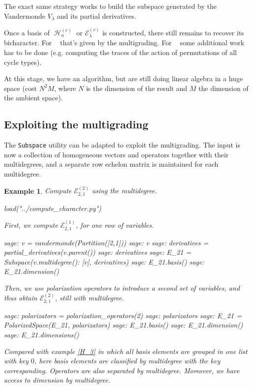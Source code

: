 \documentclass[letter,12pt]{article}
\DeclareMathOperator{\Sn}{\mathbb{S}_n}
\DeclareMathOperator{\GLr}{GL_r}
\DeclareMathOperator{\harmonics}{\mathcal{H}}
\newtheorem{example}{Example}
\begin{document}
	The exact same strategy works to build the subspace generated by the Vandermonde $V_{\lambda}$ and its partial derivatives. 
	
	Once a basis of $\harmonics_n^{(r)}$ or $\mathcal{E}_\lambda^{(r)}$ is constructed, there still remains to recover its bicharacter. For $\GLr$ that's given by the multigrading. For $\Sn$ some additional work has to be done (e.g. computing the traces of the action of permutations of all cycle types).
	
	At this stage, we have an algorithm, but are still doing linear algebra in a huge space (cost $N^2 M$, where $N$ is the dimension of the result and $M$ the dimension of the ambient space).
	
	\subsection{Exploiting the multigrading}
	
	The \texttt{Subspace} utility can be adapted to exploit the multigrading. The input is now a collection of homogeneous vectors and operators together with their multidegrees, and a separate row echelon matrix is maintained for each multidegree.
	
	\begin{example} Compute $\mathcal{E}_{2,1}^{(2)}$ using the multidegree. 
		\begin{sagesilent}
			load("../compute_character.py")
		\end{sagesilent}
		First, we compute $\mathcal{E}_{2,1}^{(1)}$, for one row of variables. 
		\begin{sagecommandline}
			sage: v = vandermonde(Partition([2,1]))
			sage: v
			sage: derivatives = partial_derivatives(v.parent())
			sage: derivatives
			sage: E_21 = Subspace({v.multidegree(): [v]}, derivatives)
			sage: E_21.basis()
			sage: E_21.dimension()
		\end{sagecommandline}
		Then, we use polarization operators to introduce a second set of variables, and thus obtain $\mathcal{E}_{2,1}^{(2)}$, still with multidegree. 
		\begin{sagecommandline}
			sage: polarizators = polarization_operators(2)
			sage: polarizators
			sage: E_21 = PolarizedSpace(E_21, polarizators)
			sage: E_21.basis()
			sage: E_21.dimension()
			sage: E_21.dimensions()
		\end{sagecommandline}
		Compared with example \ref{H_3} in which all basis elements are grouped in one list with key $0$, here basis elements are classified by multidegree with the key corresponding. Operators are also separated by multidegree. Moreover, we have access to dimension by multidegree. 
	\end{example}
	
\end{document}
